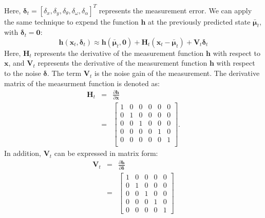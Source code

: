\documentclass[12pt, a4paper]{article}
\begin{document}
Here, $\bm{\delta}_{t}=[\delta_{x}, \delta_{y}, \delta_{\theta}, \delta_{\omega}, \delta_{\alpha}]^{T}$ represents the measurement error. We can apply the same technique to expend the function $\bm{h}$ at the previously predicted state $\bar{\bm{\mu}}_{t}$, with $\bm{\delta}_{t}=\bm{0}$:
\[
  \bm{h}(\bm{x}_{t},\bm{\delta}_{t}) \approx \bm{h}(\bar{\bm{\mu}}_{t}, \bm{0}) + \bm{H}_{t}(\bm{x}_{t}-\bar{\bm{\mu}}_{t}) + \bm{V}_{t}\bm{\delta}_{t}
\]
Here, $\bm{H}_{t}$ represents the derivative of the measurement function $\bm{h}$ with respect to $\bm{x}$, and $\bm{V}_{t}$ represents the derivative of the measurement function $\bm{h}$ with respect to the noise $\bm{\delta}$. The term $\bm{V}_{t}$ is the noise gain of the measurement. The derivative matrix of the measurment function is denoted as:
\begin{eqnarray*}
  \bm{H}_{t} & = & \frac{\partial\bm{h}}{\partial{\bm{x}}}\\ 
  & = & \begin{bmatrix}
    1 & 0 & 0 & 0 & 0 & 0\\
    0 & 1 & 0 & 0 & 0 & 0\\
    0 & 0 & 1 & 0 & 0 & 0\\
    0 & 0 & 0 & 0 & 1 & 0\\
    0 & 0 & 0 & 0 & 0 & 1\\
  \end{bmatrix}.
\end{eqnarray*}
In addition, $\bm{V}_{t}$ can be expressed in matrix form:
\begin{eqnarray*}
  \bm{V}_{t} & = & \frac{\partial \bm{h}}{\partial \bm{\delta}}\\
  & = & \begin{bmatrix}
    1 & 0 & 0 & 0 & 0\\
    0 & 1 & 0 & 0 & 0\\
    0 & 0 & 1 & 0 & 0\\
    0 & 0 & 0 & 1 & 0\\
    0 & 0 & 0 & 0 & 1
  \end{bmatrix}
\end{eqnarray*}
\end{document}

